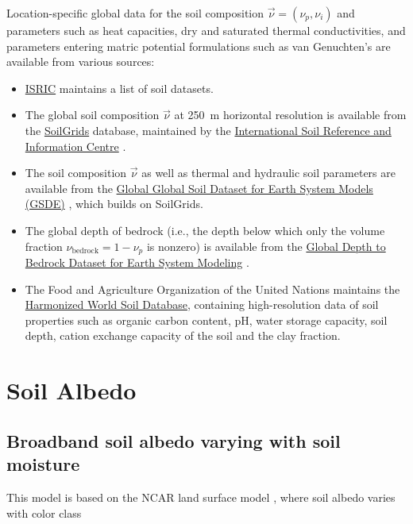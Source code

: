 \documentclass[twoside,10pt]{report}
\begin{document}
Location-specific global data for the soil composition $\vec{\nu} = (\nu_p, \nu_i)$ and parameters such as heat capacities, dry and saturated thermal conductivities, and parameters entering matric potential formulations such as van Genuchten's are available from various sources:
\begin{itemize}
    \item \href{https://www.isric.org/explore/soil-geographic-databases}{ISRIC} maintains a list of soil datasets. 
    \item The global soil composition $\vec{\nu}$ at 250~m horizontal resolution is available from the \href{https://www.isric.org/explore/soilgrids/}{SoilGrids} database, maintained by the \href{https://www.isric.org}{International Soil Reference and Information Centre} \citep{Hengl17a}.
    \item The soil composition $\vec{\nu}$ as well as thermal and hydraulic soil parameters are available from the \href{http://globalchange.bnu.edu.cn/research/soil5.jsp}{Global Global Soil Dataset for Earth System Models (GSDE)} \citep{Dai19a,Dai19b}, which builds on SoilGrids.
    \item The global depth of bedrock (i.e., the depth below which only the volume fraction $\nu_{\mathrm{bedrock}} = 1-\nu_p$ is nonzero) is available from the \href{http://globalchange.bnu.edu.cn/research/dtb.jsp}{Global Depth to Bedrock Dataset for Earth System Modeling} \citep{Shanggua17a}.
    \item The Food and Agriculture Organization of the United Nations maintains the \href{http://www.fao.org/soils-portal/soil-survey/soil-maps-and-databases/harmonized-world-soil-database-v12/en/}{Harmonized World Soil Database}, containing high-resolution data of soil properties such as organic carbon content, pH, water storage capacity, soil depth, cation exchange capacity of the soil and the clay fraction.
\end{itemize}

\section{Soil Albedo}\label{s:soil_albedo}

\subsection{Broadband soil albedo varying with soil moisture}

This model is based on the NCAR land surface model \citep{Bonan1996}, where soil albedo varies with color class
\end{document}
